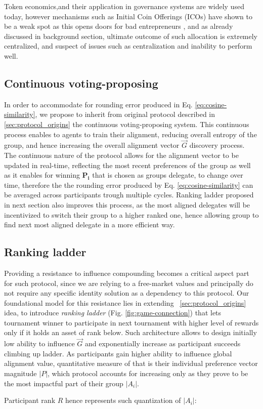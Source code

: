 \documentclass{article}
\begin{document}
\begin{CJK}{UTF8}{gbsn}
\begin{multicols}{2}
        Token economics,and their application in governance systems are widely used today, however mechanisms such as Initial Coin Offerings (ICOs) have shown to be a weak spot as this opens doors for bad entrepreneurs \cite{Johannes24}, and as already discussed in background section, ultimate outcome of such allocation is extremely centralized, and suspect of issues such as centralization and inability to perform well.

        \subsection{Continuous voting-proposing}
        In order to accommodate for rounding error produced in Eq. \ref{eq:cosine-similarity}, we propose to inherit from original protocol described in \ref{sec:protocol_origins} the continuous voting-proposing system. This continuous process enables to agents to train their alignment, reducing overall entropy of the group, and hence increasing the overall alignment vector $\vec{G}$ discovery process. The continuous nature of the protocol allows for the alignment vector to be updated in real-time, reflecting the most recent preferences of the group as well as it enables for winning $\mathbf{P_i}$ that is chosen as groups delegate, to change over time, therefore the the rounding error produced by Eq. \ref{eq:cosine-similarity} can be averaged across participants trough multiple cycles.
        Ranking ladder proposed in next section also improves this process, as the most aligned delegates will be incentivized to switch their group to a higher ranked one, hence allowing group to find next most aligned delegate in a more efficient way.

        \subsection{Ranking ladder}

        Providing a resistance to influence compounding becomes a critical aspect part for such protocol, since we are relying to a free-market values and principally do not require any specific identity solution as a dependency to this protocol.
        Our foundational model for this resistance lies in extending  ~\ref{sec:protocol_origins} idea, to introduce \textit{ranking ladder} (Fig. \ref*{fig:game-connection}) that lets tournament winner to participate in next tournament with higher level of rewards only if it holds an asset of rank below. Such architecture allows to design initially low ability to influence ${\vec{G}}$ and exponentially increase as participant succeeds climbing up ladder. As participants gain higher ability to influence global alignment value, quantitative measure of that is their individual preference vector magnitude $|P|$, which protocol accounts for increasing only as they prove to be the most impactful part of their group $|A_i|$.
        
        Participant rank $R$ hence represents such quantization of $|A_i|$:


\end{multicols}
\end{CJK}
\end{document}

